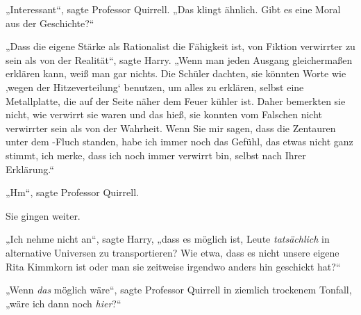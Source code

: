 „Interessant“, sagte Professor Quirrell. „Das klingt ähnlich. Gibt es eine Moral aus der Geschichte?“

„Dass die eigene Stärke als Rationalist die Fähigkeit ist, von Fiktion verwirrter zu sein als von der Realität“, sagte Harry. „Wenn man jeden Ausgang gleichermaßen erklären kann, weiß man gar nichts. Die Schüler dachten, sie könnten Worte wie ‚wegen der Hitzeverteilung‘ benutzen, um alles zu erklären, selbst eine Metallplatte, die auf der Seite näher dem Feuer kühler ist. Daher bemerkten sie nicht, wie verwirrt sie waren und das hieß, sie konnten vom Falschen nicht verwirrter sein als von der Wahrheit. Wenn Sie mir sagen, dass die Zentauren unter dem -Fluch standen, habe ich immer noch das Gefühl, das etwas nicht ganz stimmt, ich merke, dass ich noch immer verwirrt bin, selbst nach Ihrer Erklärung.“

„Hm“, sagte Professor Quirrell.

Sie gingen weiter.

„Ich nehme nicht an“, sagte Harry, „dass es möglich ist, Leute \emph{tatsächlich} in alternative Universen zu transportieren? Wie etwa, dass es nicht unsere eigene Rita Kimmkorn ist oder man sie zeitweise irgendwo anders hin geschickt hat?“

„Wenn \emph{das} möglich wäre“, sagte Professor Quirrell in ziemlich trockenem Tonfall, „wäre ich dann noch \emph{hier}?“

